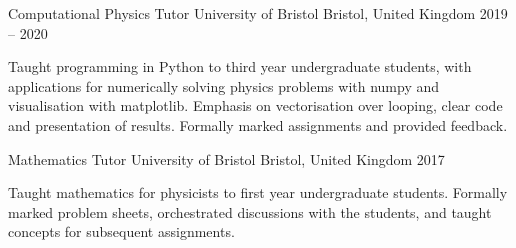 
\begin{cventries}

    \cventry
      {Computational Physics Tutor} %
      {University of Bristol} %
      {Bristol, United Kingdom} %
      {2019 -- 2020} %
      {
        \begin{cvitems} %
          \item{Taught programming in Python to third year undergraduate students, with applications for numerically solving physics problems with numpy and visualisation with matplotlib. Emphasis on vectorisation over looping, clear code and presentation of results. Formally marked assignments and provided feedback.}
        \end{cvitems}
      }

    \cventry
      {Mathematics Tutor} %
      {University of Bristol} %
      {Bristol, United Kingdom} %
      {2017} %
      {
        \begin{cvitems} %
          \item{Taught mathematics for physicists to first year undergraduate students. Formally marked problem sheets, orchestrated discussions with the students, and taught concepts for subsequent assignments.}
        \end{cvitems}
      }

\end{cventries}
